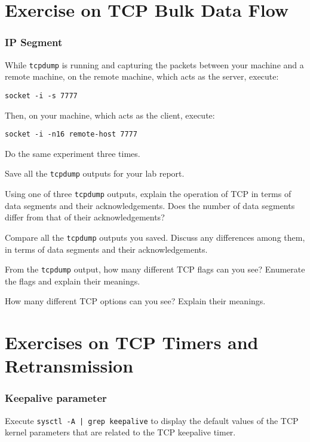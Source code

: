 \documentclass{../UTNetLab}
\begin{document}
\part{Exercise on TCP Bulk Data Flow}
\section{IP Segment}
    While \lstinline{tcpdump} is running and capturing the packets between your machine and a remote machine, on the remote machine, which acts as the server, execute:
    \begin{lstlisting}
socket -i -s 7777
    \end{lstlisting}
    Then, on your machine, which acts as the client, execute:
    \begin{lstlisting}[emph={your-host, remote-host}]
socket -i -n16 remote-host 7777
    \end{lstlisting}
    Do the same experiment three times.

    Save all the \lstinline{tcpdump} outputs for your lab report.
    
    \begin{report}
        \item Using one of three \lstinline{tcpdump} outputs, explain the operation of TCP in terms of data segments and their acknowledgements.
                Does the number of data segments differ from that of their acknowledgements?

            Compare all the \lstinline{tcpdump} outputs you saved.
            Discuss any differences among them, in terms of data segments and their acknowledgements.
        
        \item From the \lstinline{tcpdump} output, how many different TCP flags can you see? Enumerate the flags and explain their meanings.

            How many different TCP options can you see?
            Explain their meanings.
    \end{report}

\part{Exercises on TCP Timers and Retransmission}
\section{Keepalive parameter}
    Execute \lstinline{sysctl -A | grep keepalive} to display the default values of the TCP kernel parameters that are related to the TCP keepalive timer.
\end{document}
